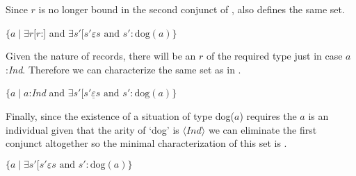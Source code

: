 Since $r$ is no longer bound in the second conjunct of \preveg{},
\nexteg{} also defines the same set.
\begin{ex} 
$\{a\mid\exists
  r[r$:] and 
$\exists s'[s'\underline{\varepsilon}s \text{ and } s':\text{dog}(a)\}$ 
\end{ex} 
Given the nature of records, there will be an $r$ of the required type
just in case $a$:\textit{Ind}.  Therefore we can characterize the same set
as in \nexteg{}.
\begin{ex} 
$\{a\mid a$:\textit{Ind} and 
$\exists s'[s'\underline{\varepsilon}s \text{ and } s':\text{dog}(a)\}$ 
\end{ex} 
Finally, since the existence of a situation of type dog($a$) requires
the $a$ is an individual given that the arity of `dog' is
$\langle\textit{Ind}\rangle$ we can eliminate the first conjunct
altogether so the minimal characterization of this set is \nexteg{}.
\begin{ex} 
$\{a\mid  
\exists s'[s'\underline{\varepsilon}s \text{ and } s':\text{dog}(a)\}$  
\end{ex} 

